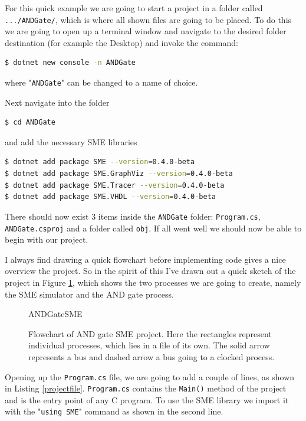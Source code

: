         For this quick example we are going to start a project in a folder called \texttt{.../ANDGate/}, which is where all shown files are going to be placed.
        To do this we are going to open up a terminal window and navigate to the desired folder destination (for example the Desktop) and invoke the command: 
        
        \begin{lstlisting}[language=bash]
$ dotnet new console -n ANDGate
        \end{lstlisting}
        where "\texttt{ANDGate}" can be changed to a name of choice.
        
        Next navigate into the folder
        \begin{lstlisting}[language=bash]
$ cd ANDGate 
        \end{lstlisting}
        and add the necessary SME libraries
        \begin{lstlisting}[language=bash]
$ dotnet add package SME --version=0.4.0-beta
$ dotnet add package SME.GraphViz --version=0.4.0-beta
$ dotnet add package SME.Tracer --version=0.4.0-beta
$ dotnet add package SME.VHDL --version=0.4.0-beta
        \end{lstlisting}
        
        There should now exist 3 items inside the \texttt{ANDGate} folder: \texttt{Program.cs}, \texttt{ANDGate.csproj} and a folder called \texttt{obj}. If all went well we should now be able to begin with our project.
        
        I always find drawing a quick flowchart before implementing code gives a nice overview the project. So in the spirit of this I've drawn out a quick sketch of the project in Figure \ref{fig:ANDGateSME}, which shows the two processes we are going to create, namely the SME simulator and the AND gate process.
        
        \begin{figure}[h!]
            \vspace*{-1.5cm}
            \centering
            {ANDGateSME}
            \caption{Flowchart of AND gate SME project. Here the rectangles represent individual processes, which lies in a file of its own. The solid arrow represents a bus and dashed arrow a bus going to a clocked process.}
            \label{fig:ANDGateSME}
        \end{figure}  
        
        
\newpage
        Opening up the \texttt{Program.cs} file, we are going to add a couple of lines, as shown in Listing \ref{projectfile}. \texttt{Program.cs} contains the \texttt{Main()} method of the project and is the entry point of any C program. To use the SME library we import it with the "\texttt{using SME}" command as shown in the second line. 
        
